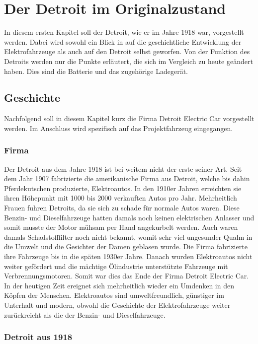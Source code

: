 \chapter{Der Detroit im Originalzustand}
In diesem ersten Kapitel soll der Detroit, wie er im Jahre 1918 war, vorgestellt werden. Dabei wird sowohl ein Blick in auf die geschichtliche Entwicklung der Elektrofahrzeuge als auch auf den Detroit selbst geworfen. Von der Funktion des Detroits werden nur die Punkte erläutert, die sich im Vergleich zu heute geändert haben. Dies sind die Batterie und das zugehörige Ladegerät.

\section{Geschichte}

Nachfolgend soll in diesem Kapitel kurz die Firma Detroit Electric Car vorgestellt werden. Im Anschluss wird spezifisch auf das Projektfahrzeug eingegangen.

\subsection{Firma}

Der Detroit aus dem Jahre 1918 ist bei weitem nicht der erste seiner Art. Seit dem Jahr 1907 fabrizierte die amerikanische Firma aus Detroit, welche bis dahin Pferdekutschen produzierte, Elektroautos. In den 1910er Jahren erreichten sie ihren Höhepunkt mit 1000 bis 2000 verkauften Autos pro Jahr. Mehrheitlich Frauen fuhren Detroits, da sie sich zu schade für normale Autos waren. Diese Benzin- und Dieselfahrzeuge hatten damals noch keinen elektrischen Anlasser und somit musste der Motor mühsam per Hand angekurbelt werden. Auch waren damals Schadstofffilter noch nicht bekannt, womit sehr viel ungesunder Qualm in die Umwelt und die Gesichter der Damen geblasen wurde. Die Firma fabrizierte ihre Fahrzeuge bis in die späten 1930er Jahre. Danach wurden Elektroautos nicht weiter gefördert und die mächtige Ölindustrie unterstützte Fahrzeuge mit Verbrennungsmotoren. Somit war dies das Ende der Firma Detroit Electric Car.
In der heutigen Zeit ereignet sich mehrheitlich wieder ein Umdenken in den Köpfen der Menschen. Elektroautos sind umweltfreundlich, günstiger im Unterhalt und modern, obwohl die Geschichte der Elektrofahrzeuge weiter zurückreicht als die der Benzin- und Dieselfahrzeuge.

\subsection{Detroit aus 1918}

